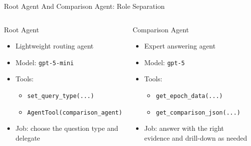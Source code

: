 \documentclass[10pt]{beamer}
\newcommand{\goodbox}[2]{
  \begin{block}{#1}
  #2
  \end{block}
}
\newcommand{\func}[1]{\texttt{#1}}
\begin{document}
\begin{frame}{Root Agent And Comparison Agent: Role Separation}
  \begin{columns}[T]
    \goodbox{Root Agent}{
      \begin{itemize}
        \item Lightweight routing agent
        \item Model: \func{gpt-5-mini}
        \item Tools:
        \begin{itemize}
          \item \func{set\_query\_type(...)}
          \item \func{AgentTool(comparison\_agent)}
        \end{itemize}
        \item Job: choose the question type and delegate
      \end{itemize}
    }
    \goodbox{Comparison Agent}{
      \begin{itemize}
        \item Expert answering agent
        \item Model: \func{gpt-5}
        \item Tools:
        \begin{itemize}
          \item \func{get\_epoch\_data(...)}
          \item \func{get\_comparison\_json(...)}
        \end{itemize}
        \item Job: answer with the right evidence and drill-down as needed
      \end{itemize}
    }
  \end{columns}
\end{frame}
\end{document}
